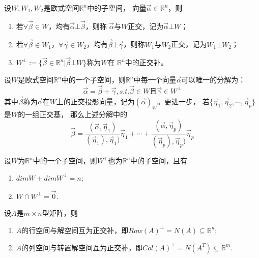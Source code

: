 \begin{Def}
设$W,W_1,W_2$是欧式空间$\mathbb{R}^{n}$中的子空间，
向量$\vec{\alpha}\in\mathbb{R}^n$，则
\begin{enumerate}
  \item 若$\forall\vec{\beta}\in W$，均有$\vec{\alpha}\bot\vec{\beta}$，则称
        $\vec{\alpha}$与$W$正交，记为$\vec{\alpha}\bot W$；
  \item 若$\forall\vec{\beta}\in W_1$，$\forall\vec{\gamma}\in W_2$，均有$\vec{\beta}\bot\vec{\gamma}$，则称$W_1$与$W_2$正交，记为$W_1\bot W_2$；
  \item $W^{\bot}:=\{\vec{\beta}\in\mathbb{R}^n|\vec{\beta}\bot W\}$称为$W$在
       $\mathbb{R}^n$中的正交补。
\end{enumerate}
\end{Def}

\begin{thm}
[正交分解]设$W$是欧式空间$\mathbb{R}^n$中的一个子空间，则$\mathbb{R}^n$中每一个向量$\vec{\alpha}$可以唯一的分解为：
\begin{equation*}
\vec{\alpha}=\vec{\beta}+\vec{\gamma},s.t.\vec{\beta}\in W\text{且}\vec{\gamma}\in W^{\bot}
\end{equation*}
其中$\vec{\beta}$称为$\vec{\alpha}$在$W$上的正交投影向量，记为$(\vec{\alpha})_{W}$。更进一步，
若$\{\vec{\eta}_1,\vec{\eta}_2,\cdots,\vec{\eta}_p\}$
是$W$的一组正交基，
那么上述分解中的
\begin{equation*}
\vec{\beta}=\frac{(\vec{\alpha},\vec{\eta}_1)}{(\vec{\eta}_1),\vec{\eta}_1)}\vec{\eta}_1
+\cdots+\frac{(\vec{\alpha},\vec{\eta}_p)}{(\vec{\eta}_p),\vec{\eta}_p)}\vec{\eta}_p
\end{equation*}
\end{thm}

\begin{thm}
设$W$为$\mathbb{R}^n$中的一个子空间，则$W^{\bot}$也为$\mathbb{R}^n$中的子空间，且有
\begin{enumerate}
  \item $dimW+dimW^{\bot}=n$;
  \item $W\cap W^{\bot}={\vec{0}}$.
\end{enumerate}
\end{thm}

\begin{thm}
设$A$是$m\times n$型矩阵，则
\begin{enumerate}
  \item $A$的行空间与解空间互为正交补，即$Row(A)^{\bot}=N(A)\subseteq\mathbb{R}^n$;
  \item $A$的列空间与转置解空间互为正交补，即$Col(A)^{\bot}=N(A^T)\subseteq\mathbb{R}^m$.
\end{enumerate}
\end{thm}

